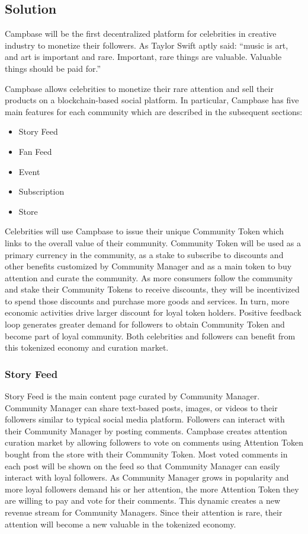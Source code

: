 \documentclass[letterpaper,11pt]{article}
\begin{document}
\subsection{Solution}
Campbase will be the first decentralized platform for celebrities in creative industry to monetize their followers. As Taylor Swift aptly said: “music is art, and art is important and rare. Important, rare things are valuable. Valuable things should be paid for.”~\cite{taylorswiftspotify}

Campbase allows celebrities to monetize their rare attention and sell their products on a blockchain-based social platform. In particular, Campbase has five main features for each community which are described in the subsequent sections:
\begin{itemize}
\setlength\itemsep{0em}
\item Story Feed
\item Fan Feed
\item Event
\item Subscription
\item Store
\end{itemize}


Celebrities will use Campbase to issue their unique Community Token which links to the overall value of their community. Community Token will be used as a primary currency in the community, as a stake to subscribe to discounts and other benefits customized by Community Manager and as a main token to buy attention and curate the community. As more consumers follow the community and stake their Community Tokens to receive discounts, they will be incentivized to spend those discounts and purchase more goods and services. In turn, more economic activities drive larger discount for loyal token holders. Positive feedback loop generates greater demand for followers to obtain Community Token and become part of loyal community. Both celebrities and followers can benefit from this tokenized economy and curation market.

\subsubsection{Story Feed}
Story Feed is the main content page curated by Community Manager. Community Manager can share text-based posts, images, or videos to their followers similar to typical social media platform. Followers can interact with their Community Manager by posting comments. Campbase creates attention curation market by allowing followers to vote on comments using Attention Token bought from the store with their Community Token. Most voted comments in each post will be shown on the feed so that Community Manager can easily interact with loyal followers. As Community Manager grows in popularity and more loyal followers demand his or her attention, the more Attention Token they are willing to pay and vote for their comments. This dynamic creates a new revenue stream for Community Managers. Since their attention is rare, their attention will become a new valuable in the tokenized economy.
\end{document}
